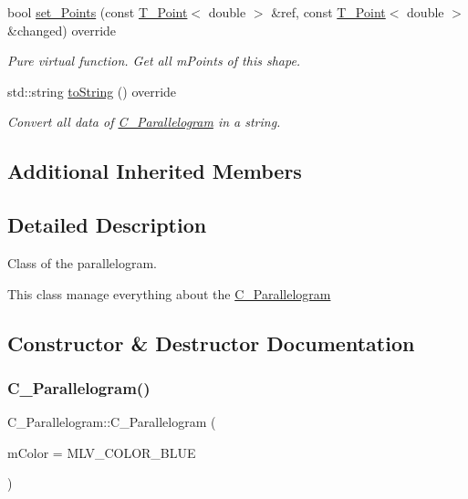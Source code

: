 \begin{DoxyCompactItemize}
bool \hyperlink{classParallelogram_ab74583703a60e4b798d7048aa684f44e}{set\+\_\+\+Points} (const \hyperlink{classPoint}{T_Point}$<$ double $>$ \&ref, const \hyperlink{classPoint}{T_Point}$<$ double $>$ \&changed) override
\begin{DoxyCompactList}\small\item\em Pure virtual function. Get all mPoints of this shape. \end{DoxyCompactList}\item
std\+::string \hyperlink{classParallelogram_a9caae0044f23d8a1e87b1a78d852c37f}{to\+String} () override
\begin{DoxyCompactList}\small\item\em Convert all data of \hyperlink{classParallelogram}{C_Parallelogram} in a string. \end{DoxyCompactList}\end{DoxyCompactItemize}
\subsection*{Additional Inherited Members}


\subsection{Detailed Description}
Class of the parallelogram. 

This class manage everything about the \hyperlink{classParallelogram}{C_Parallelogram}

\subsection{Constructor \& Destructor Documentation}
\mbox{\label{classParallelogram_a2200aa50be9b13ccb40a371a3d2b119b}} 
\subsubsection{\texorpdfstring{C_Parallelogram()}{C_Parallelogram()}\hspace{0.1cm}{\footnotesize\ttfamily [1/3]}}
{\footnotesize\ttfamily C_Parallelogram\+::\+C_Parallelogram (\begin{DoxyParamCaption}\item[{M\+L\+V\+\_\+\+Color}]{mColor = {\ttfamily MLV\+\_\+COLOR\+\_\+BLUE} }\end{DoxyParamCaption})\hspace{0.3cm}{\ttfamily [explicit]}}



